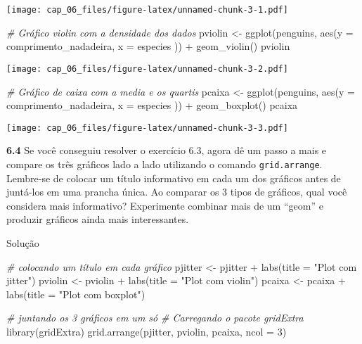 \documentclass[
]{book}
\newenvironment{Shaded}{\begin{snugshade}}{\end{snugshade}}
\newcommand{\AttributeTok}[1]{\textcolor[rgb]{0.77,0.63,0.00}{#1}}
\newcommand{\CommentTok}[1]{\textcolor[rgb]{0.56,0.35,0.01}{\textit{#1}}}
\newcommand{\DecValTok}[1]{\textcolor[rgb]{0.00,0.00,0.81}{#1}}
\newcommand{\FunctionTok}[1]{\textcolor[rgb]{0.00,0.00,0.00}{#1}}
\newcommand{\NormalTok}[1]{#1}
\newcommand{\OtherTok}[1]{\textcolor[rgb]{0.56,0.35,0.01}{#1}}
\newcommand{\SpecialCharTok}[1]{\textcolor[rgb]{0.00,0.00,0.00}{#1}}
\newcommand{\StringTok}[1]{\textcolor[rgb]{0.31,0.60,0.02}{#1}}
\begin{document}
\texttt{[image: cap\_06\_files/figure-latex/unnamed-chunk-3-1.pdf]}

\begin{Shaded}
\begin{Highlighting}[]

\CommentTok{\# Gráfico violin com a densidade dos dados}
\NormalTok{pviolin }\OtherTok{\textless{}{-}} \FunctionTok{ggplot}\NormalTok{(penguins, }\FunctionTok{aes}\NormalTok{(}\AttributeTok{y =}\NormalTok{ comprimento\_nadadeira, }\AttributeTok{x =}\NormalTok{ especies )) }\SpecialCharTok{+}
  \FunctionTok{geom\_violin}\NormalTok{()}
\NormalTok{pviolin}
\end{Highlighting}
\end{Shaded}

\texttt{[image: cap\_06\_files/figure-latex/unnamed-chunk-3-2.pdf]}

\begin{Shaded}
\begin{Highlighting}[]

\CommentTok{\# Gráfico de caixa com a media e os quartis}
\NormalTok{pcaixa  }\OtherTok{\textless{}{-}} \FunctionTok{ggplot}\NormalTok{(penguins, }\FunctionTok{aes}\NormalTok{(}\AttributeTok{y =}\NormalTok{ comprimento\_nadadeira, }\AttributeTok{x =}\NormalTok{ especies )) }\SpecialCharTok{+}
  \FunctionTok{geom\_boxplot}\NormalTok{()}
\NormalTok{pcaixa}
\end{Highlighting}
\end{Shaded}

\texttt{[image: cap\_06\_files/figure-latex/unnamed-chunk-3-3.pdf]}

\textbf{6.4}
Se você conseguiu resolver o exercício 6.3, agora dê um passo a mais e compare os três gráficos lado a lado utilizando o comando \texttt{grid.arrange}. Lembre-se de colocar um título informativo em cada um dos gráficos antes de juntá-los em uma prancha única. Ao comparar os 3 tipos de gráficos, qual você considera mais informativo? Experimente combinar mais de um ``geom'' e produzir gráficos ainda mais interessantes.

Solução

\begin{Shaded}
\begin{Highlighting}[]
\CommentTok{\# colocando um título em cada gráfico}
\NormalTok{pjitter }\OtherTok{\textless{}{-}}\NormalTok{ pjitter }\SpecialCharTok{+} \FunctionTok{labs}\NormalTok{(}\AttributeTok{title =} \StringTok{"Plot com jitter"}\NormalTok{)}
\NormalTok{pviolin }\OtherTok{\textless{}{-}}\NormalTok{ pviolin }\SpecialCharTok{+} \FunctionTok{labs}\NormalTok{(}\AttributeTok{title =} \StringTok{"Plot com violin"}\NormalTok{)}
\NormalTok{pcaixa  }\OtherTok{\textless{}{-}}\NormalTok{ pcaixa }\SpecialCharTok{+} \FunctionTok{labs}\NormalTok{(}\AttributeTok{title =} \StringTok{"Plot com boxplot"}\NormalTok{)}

\CommentTok{\# juntando os 3 gráficos em um só}
\CommentTok{\# Carregando o pacote gridExtra}
\FunctionTok{library}\NormalTok{(gridExtra)}
\FunctionTok{grid.arrange}\NormalTok{(pjitter, pviolin, pcaixa, }\AttributeTok{ncol =} \DecValTok{3}\NormalTok{)}
\end{Highlighting}
\end{Shaded}
\end{document}
